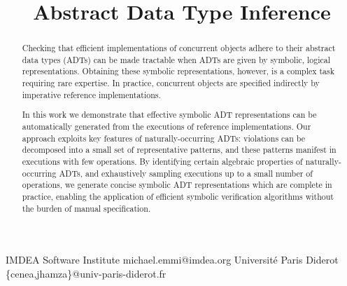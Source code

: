 \documentclass[10pt,preprint,nocopyrightspace,natbib,authoryear]{sigplanconf}
\begin{document}
\setlength{\pdfpageheight}{\paperheight}
\setlength{\pdfpagewidth}{\paperwidth}






\title{Abstract Data Type Inference}

           {IMDEA Software Institute}
           {michael.emmi@imdea.org}
           {Université Paris Diderot}
           {\{cenea,jhamza\}@univ-paris-diderot.fr}

\maketitle

\begin{abstract}

  Checking that efficient implementations of concurrent objects adhere to their
  abstract data types (ADTs) can be made tractable when ADTs are given by
  symbolic, logical representations. Obtaining these symbolic representations,
  however, is a complex task requiring rare expertise. In practice, concurrent
  objects are specified indirectly by imperative reference implementations.

  In this work we demonstrate that effective symbolic ADT representations can
  be automatically generated from the executions of reference implementations.
  Our approach exploits key features of naturally-occurring ADTs: violations
  can be decomposed into a small set of representative patterns, and these
  patterns manifest in executions with few operations. By identifying certain
  algebraic properties of naturally-occurring ADTs, and exhaustively sampling
  executions up to a small number of operations, we generate concise symbolic
  ADT representations which are complete in practice, enabling the application
  of efficient symbolic verification algorithms without the burden of manual
  specification.

\end{abstract}
\end{document}
